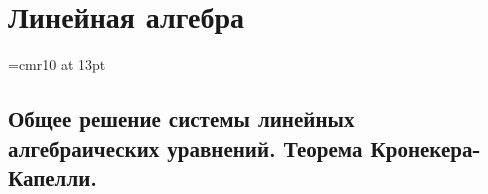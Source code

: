 \part[Линейная алгебра]{Линейная алгебра}%

\font\Large=cmr10 at 13pt
\newcount\rowcount{}
\def\fudge#1{\smash{\hbox{\Large#1}}}
\def\doublyso{\kern+2em\smash{\vrule height \rowcount em depth .2em}\hidewidth}			%
\chapter{Общее решение системы линейных алгебраических уравнений. Теорема Кронекера-Капелли.}
